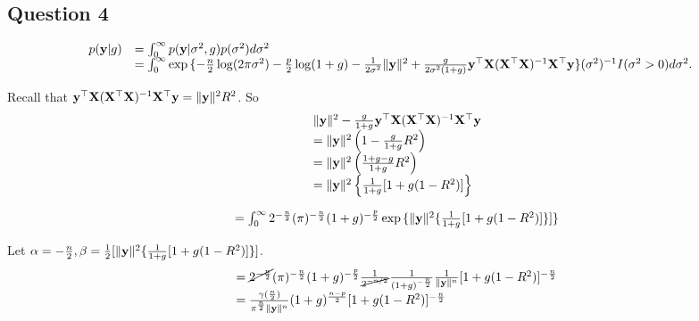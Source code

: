 \documentclass{article}[12pt]
\begin{document}
\subsection{Question 4}
\begin{equation*}
\begin{array}{ll}
p({\bf y} | g) &= \int_0^\infty p({\bf y} | \sigma^2, g) p(\sigma^2) d \sigma^2 \\
&= \int_0^\infty \exp{\{ -\frac{n}{2} \log (2 \pi \sigma^2) - \frac{p}{2} \log(1 + g)
	 - \frac{1}{2 \sigma^2} \| {\bf y}\|^2
	 + \frac{g}{2 \sigma^2 (1 + g)} {\bf y}^\top {\bf X}({\bf X}^\top {\bf X})^{-1} {\bf X}^\top {\bf y}\}}
	 (\sigma^2)^{-1} I(\sigma^2 > 0) d \sigma^2.
\end{array}
\end{equation*}

Recall that ${\bf y}^\top {\bf X}({\bf X}^\top {\bf X})^{-1} {\bf X}^\top {\bf y} = \| {\bf y} \|^2 R^2$. So
\begin{equation*}
\begin{array}{ll}
& \| {\bf y} \|^2 -\frac{g}{1 + g} {\bf y}^\top {\bf X} ({\bf X}^\top {\bf X})^{-1} {\bf X}^\top {\bf y} \\
&= \| {\bf y} \|^2 \left(1 - \frac{g}{1 + g}R^2 \right) \\
&= \| {\bf y} \|^2 \left(\frac{1 + g - g}{1 + g} R^2 \right) \\
&= \| {\bf y} \|^2 \left\{ \frac{1}{1 + g} [ 1 + g(1 - R^2) ] \right\}
\end{array}
\end{equation*}

\begin{equation*}
\begin{array}{ll}
&= \int_0^\infty 2^{-\frac{n}{2}} (\pi)^{-\frac{n}{2}} (1 + g)^{-\frac{p}{2}} \exp{\{ \| {\bf y}\|^2 \{ \frac{1}{1 + g} [1 + g(1 - R^2)] \}} ] \}
\end{array}
\end{equation*}

Let $\alpha = -\frac{n}{2}, \beta = {\tfrac{1}{2}} [\| {\bf y} \|^2 \{ \frac{1}{1 + g} [1 + g(1 - R^2)] \}]$.
\begin{equation*}
\begin{array}{ll}
&= \cancel{2^{- \frac{n}{2}}} (\pi)^{-\frac{n}{2}} (1 + g)^{-\frac{p}{2}} \frac{1}{\cancel{2^{-n/2}}} \frac{1}{(1 + g)^{-\frac{n}{2}}} \frac{1}{\| {\bf y} \|^n} [1 + g(1 - R^2)]^{-\frac{n}{2}} \\
&= \frac{\gamma(\frac{n}{2})}{\pi^{\frac{n}{2}} \| {\bf y} \|^n} (1 + g)^{\frac{n - p}{2}} [1 + g(1 - R^2)]^{-\frac{n}{2}}
\end{array}
\end{equation*}
\end{document}
